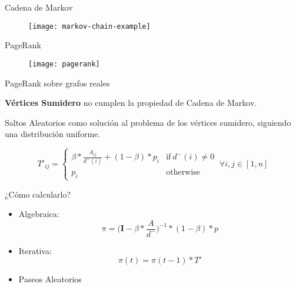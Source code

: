 \documentclass[12pt]{beamer}
\begin{document}
    \begin{frame}[fragile]{Cadena de Markov}

      \begin{figure}
        \texttt{[image: markov-chain-example]}
        \caption{}
      \end{figure}

    \end{frame}

    \begin{frame}[fragile]{PageRank}

      \begin{figure}
        \texttt{[image: pagerank]}
        \caption{}
      \end{figure}

    \end{frame}

    \begin{frame}[fragile]{PageRank sobre grafos reales}

      \textbf{Vértices Sumidero} no cumplen la propiedad de Cadena de Markov.

      Saltos Aleatorios como solución al problema de los vértices sumidero, siguiendo una distribución uniforme.

      \begin{equation}
        T'_{ij} =
        \begin{cases}
          \beta * \frac{A_{ij}}{d^-(i)} + (1- \beta) * p_{i} & \mbox{if} \ d^-(i) \neq 0 \\
          p_{i}&\mbox{otherwise}
        \end{cases} \ \forall i,j \in [1, n]
      \end{equation}
    \end{frame}

    \begin{frame}[fragile]{¿Cómo calcularlo?}

      \begin{itemize}
        \item Algebraica:
          \begin{equation}
            \pi = \bigg(\boldsymbol{I} - \beta * \frac{A}{d^-}\bigg)^{-1} * (1-\beta)*p
          \end{equation}
        \item Iterativa:
          \begin{equation}
            \pi(t) = \pi(t-1) * T'
          \end{equation}
        \item Paseos Aleatorios
      \end{itemize}
    \end{frame}
\end{document}
